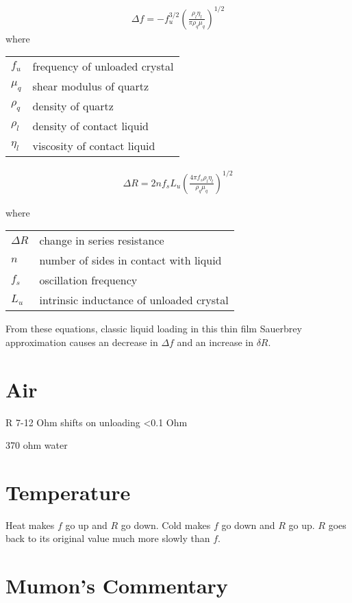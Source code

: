 \documentclass[a4paper]{article}
\begin{document}
\begin{align}
  \Delta f = -f_u^{3/2} \left(\frac{\rho_l \eta_l}{\pi \rho_q \mu_q}\right)^{1/2}
\end{align}
where

\begin{tabular}{ll}
  $f_u$    & frequency of unloaded crystal \\
  $\mu_q$  & shear modulus of quartz       \\
  $\rho_q$ & density of quartz             \\
  $\rho_l$ & density of contact liquid     \\
  $\eta_l$ & viscosity of contact liquid
\end{tabular}

\begin{align}
  \Delta R = 2 n f_s L_u \left(\frac{4 \pi f_s \rho_l \eta_l}{\rho_q \mu_q}\right)^{1/2}
\end{align}

where
\begin{tabular}{ll}
  $\Delta R$ & change in series resistance              \\
  $n$        & number of sides in contact with liquid   \\
  $f_s$      & oscillation frequency                    \\
  $L_u$      & intrinsic inductance of unloaded crystal \\
\end{tabular}

From these equations, classic liquid loading in this thin film Sauerbrey
approximation causes an decrease in $\Delta f$ and an increase in $\delta
  R$.

\section{Air}
R 7-12 Ohm
shifts on unloading <0.1 Ohm

370 ohm water

\section{Temperature}
Heat makes $f$ go up and $R$ go down.  Cold makes $f$ go down and $R$ go
up.  $R$ goes back to its original value much more slowly than $f$.

\section{Mumon's Commentary}
\end{document}

